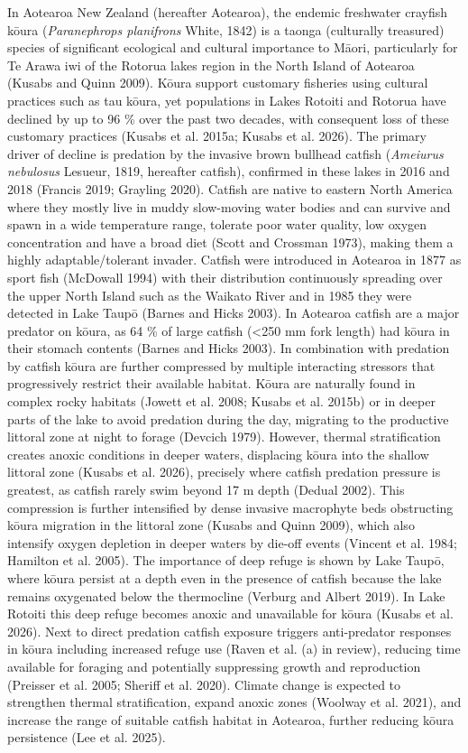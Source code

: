 \documentclass[
  12pt,
  a4paper,
  oneside]{scrbook}
\begin{document}
In Aotearoa New Zealand (hereafter Aotearoa), the endemic freshwater
crayfish kōura (\emph{Paranephrops planifrons} White, 1842) is a taonga
(culturally treasured) species of significant ecological and cultural
importance to Māori, particularly for Te Arawa iwi of the Rotorua lakes
region in the North Island of Aotearoa (Kusabs and Quinn 2009). Kōura
support customary fisheries using cultural practices such as tau kōura,
yet populations in Lakes Rotoiti and Rotorua have declined by up to 96
\% over the past two decades, with consequent loss of these customary
practices (Kusabs et al. 2015a; Kusabs et al. 2026). The primary driver
of decline is predation by the invasive brown bullhead catfish
(\emph{Ameiurus nebulosus} Lesueur, 1819, hereafter catfish), confirmed
in these lakes in 2016 and 2018 (Francis 2019; Grayling 2020). Catfish
are native to eastern North America where they mostly live in muddy
slow-moving water bodies and can survive and spawn in a wide temperature
range, tolerate poor water quality, low oxygen concentration and have a
broad diet (Scott and Crossman 1973), making them a highly
adaptable/tolerant invader. Catfish were introduced in Aotearoa in 1877
as sport fish (McDowall 1994) with their distribution continuously
spreading over the upper North Island such as the Waikato River and in
1985 they were detected in Lake Taupō (Barnes and Hicks 2003). In
Aotearoa catfish are a major predator on kōura, as 64 \% of large
catfish (\textless250 mm fork length) had kōura in their stomach
contents (Barnes and Hicks 2003). In combination with predation by
catfish kōura are further compressed by multiple interacting stressors
that progressively restrict their available habitat. Kōura are naturally
found in complex rocky habitats (Jowett et al. 2008; Kusabs et al.
2015b) or in deeper parts of the lake to avoid predation during the day,
migrating to the productive littoral zone at night to forage (Devcich
1979). However, thermal stratification creates anoxic conditions in
deeper waters, displacing kōura into the shallow littoral zone (Kusabs
et al. 2026), precisely where catfish predation pressure is greatest, as
catfish rarely swim beyond 17 m depth (Dedual 2002). This compression is
further intensified by dense invasive macrophyte beds obstructing kōura
migration in the littoral zone (Kusabs and Quinn 2009), which also
intensify oxygen depletion in deeper waters by die-off events (Vincent
et al. 1984; Hamilton et al. 2005). The importance of deep refuge is
shown by Lake Taupō, where kōura persist at a depth even in the presence
of catfish because the lake remains oxygenated below the thermocline
(Verburg and Albert 2019). In Lake Rotoiti this deep refuge becomes
anoxic and unavailable for kōura (Kusabs et al. 2026). Next to direct
predation catfish exposure triggers anti-predator responses in kōura
including increased refuge use (Raven et al. (a) in review), reducing
time available for foraging and potentially suppressing growth and
reproduction (Preisser et al. 2005; Sheriff et al. 2020). Climate change
is expected to strengthen thermal stratification, expand anoxic zones
(Woolway et al. 2021), and increase the range of suitable catfish
habitat in Aotearoa, further reducing kōura persistence (Lee et al.
2025).
\end{document}
